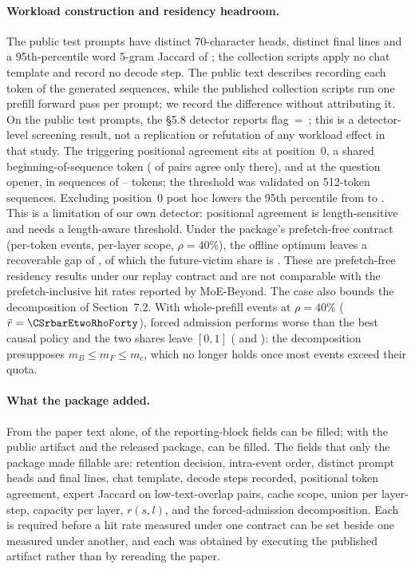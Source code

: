 \paragraph{Workload construction and residency headroom.}
The \CStestPrompts{} public test prompts have \CSheadsDistinct{} distinct
70-character heads, \CSfinalsDistinct{} distinct final lines and a 95th-percentile
word 5-gram Jaccard of \CSpromptJaccardPninetyfive{}; the collection scripts
apply no chat template and record no decode step. The public text describes
recording each token of the generated sequences, while the published collection
scripts run one prefill forward pass per prompt; we record the difference without
attributing it. On the public test prompts, the \S5.8 detector reports
flag~=~\CSdetectorFlag{}; this is a detector-level screening result, not a
replication or refutation of any workload effect in that study. The triggering
positional agreement sits at position~0, a shared beginning-of-sequence token
(\CSonlyBosShare{} of pairs agree only there), and at the question opener, in
sequences of \CSlenMin{}--\CSlenMax{} tokens; the threshold was validated on
512-token sequences. Excluding position~0 post hoc lowers the 95th percentile
from \CSposAgreePninetyfive{} to \CSposAgreeNoBosPninetyfive{}. This is a
limitation of our own detector: positional agreement is length-sensitive and
needs a length-aware threshold.
Under the package's prefetch-free contract (per-token events, per-layer scope,
$\rho = 40\%$), the offline optimum leaves a recoverable gap of
\CSgapRhoForty{}, of which the future-victim share is \CSfvShareRhoForty{}.
These are prefetch-free residency results under our replay contract and are not
comparable with the prefetch-inclusive hit rates reported by MoE-Beyond.
The case also bounds the decomposition of Section~7.2. With whole-prefill events
at $\rho = 40\%$ ($\bar r = \CSrbarEtwoRhoForty$), forced admission performs
worse than the best causal policy and the two shares leave $[0,1]$
(\CSadmShareBreak{} and \CSfvShareBreak{}): the decomposition presupposes
$m_B \le m_F \le m_c$, which no longer holds once most events exceed their quota.

\paragraph{What the package added.}
From the paper text alone, \CSfieldsPaperOnly{} of the \CSfieldsTotal{}
reporting-block fields can be filled; with the public artifact and the released
package, \CSfieldsWithArtifacts{} can be filled. The fields that only the package
made fillable are: retention decision, intra-event order, distinct prompt heads
and final lines, chat template, decode steps recorded, positional token
agreement, expert Jaccard on low-text-overlap pairs, cache scope, union per
layer-step, capacity per layer, $r(s,l)$, and the forced-admission decomposition.
Each is required before a hit rate measured under one contract can be set beside
one measured under another, and each was obtained by executing the published
artifact rather than by rereading the paper.
